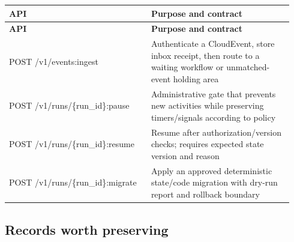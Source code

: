 \BookTableStart
\small
\begin{longtable}{@{}Y{0.4700\linewidth}Y{0.4700\linewidth}@{}}
\color{white}\bfseries \textbf{API} & \color{white}\bfseries \textbf{Purpose and contract} \\
\endfirsthead
{}
\color{white}\bfseries \textbf{API} & \color{white}\bfseries \textbf{Purpose and contract} \\
\endhead
POST /v1/events:ingest & Authenticate a CloudEvent, store inbox receipt, then route to a waiting workflow or unmatched-event holding area \\
POST /v1/runs/\{run\_id\}:pause & Administrative gate that prevents new activities while preserving timers/signals according to policy \\
POST /v1/runs/\{run\_id\}:resume & Resume after authorization/version checks; requires expected state version and reason \\
POST /v1/runs/\{run\_id\}:migrate & Apply an approved deterministic state/code migration with dry-run report and rollback boundary \\
\end{longtable}
\BookTableEnd

\subsection{Records worth preserving}

